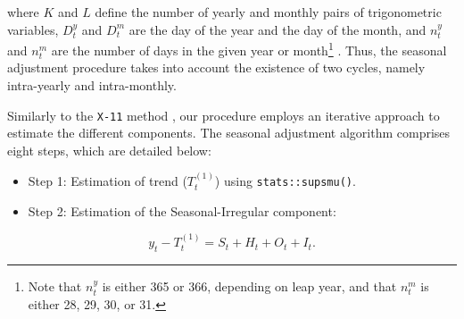 where \(K\) and \(L\) define the number of yearly and monthly pairs of trigonometric variables, \(D_{t}^{y}\) and \(D_{t}^{m}\) are the day of the year and the day of the
month, and \(n_{t}^{y}\) and \(n_{t}^{m}\) are the number of days in the given
year or month\footnote{Note that \(n^y_t\) is either 365 or 366, depending on leap year, and that \(n^m_t\) is either 28, 29, 30, or 31.} \citep{Pierce_1984}. Thus, the seasonal adjustment procedure takes into account the existence of two cycles, namely intra-yearly and intra-monthly.

Similarly to the \texttt{X-11} method \citep{ladiray2001}, our procedure employs an iterative approach to estimate the different components. The seasonal adjustment algorithm comprises eight steps, which are detailed below:

\begin{itemize}
\item
  Step 1: Estimation of trend (\(T_{t}^{(1)}\)) using \texttt{stats::supsmu()}.
\item
  Step 2: Estimation of the Seasonal-Irregular component:
\end{itemize}

\begin{equation*}
    y_{t}-T_{t}^{(1)}=S_{t}+H_{t}+O_{t}+I_{t}.
\end{equation*}

